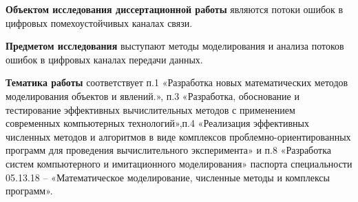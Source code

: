 \documentclass[twoside,12pt]{article}
\begin{document}
 \textbf{Объектом исследования диссертационной работы} являются потоки ошибок в цифровых помехоустойчивых каналах связи.

 \textbf{Предметом исследования} выступают методы моделирования и анализа потоков ошибок в цифровых каналах передачи данных.

 \textbf{Тематика работы} соответствует п.1 «Разработка новых математических методов моделирования объектов и явлений.», п.3 «Разработка,  обоснование  и  тестирование  эффективных  вычислительных методов с применением современных компьютерных технологий»,п.4 «Реализация  эффективных  численных  методов  и  алгоритмов  в  виде комплексов  проблемно-ориентированных  программ  для  проведения вычислительного эксперимента» и п.8 «Разработка систем компьютерного и имитационного моделирования» паспорта специальности 05.13.18 – «Математическое моделирование, численные методы и комплексы программ».
\end{document}
